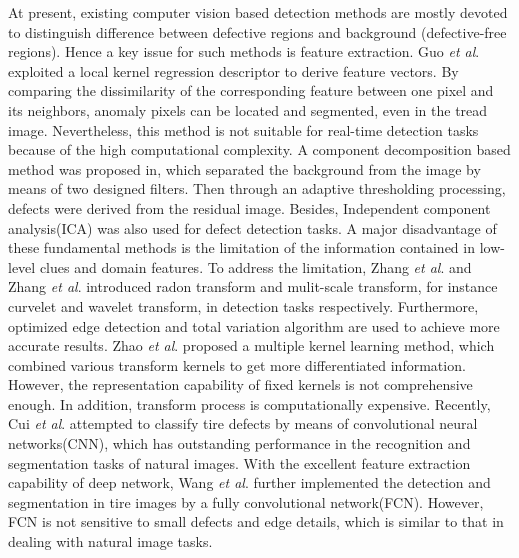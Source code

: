 \documentclass{article}
\begin{document}
At present, existing computer vision based detection methods are mostly devoted to distinguish difference between defective regions and background (defective-free regions). Hence a key issue for such methods is feature extraction. Guo {\it et al}.\cite{guo2016defect} exploited a local kernel regression descriptor to derive feature vectors. By comparing the dissimilarity of the corresponding feature between one pixel and its neighbors, anomaly pixels can be located and segmented, even in the tread image. Nevertheless, this method is not suitable for real-time detection tasks because of the high computational complexity. A component decomposition based method was proposed in\cite{guo2012tire}, which separated the background from the image by means of two designed filters. Then through an adaptive thresholding processing, defects were derived from the residual image. Besides, Independent component analysis(ICA) was also used for defect detection tasks\cite{cui2016defect,cui2016novel}. A major disadvantage of these fundamental methods is the limitation of the information contained in low-level clues and domain features. To address the limitation, Zhang {\it et al}.\cite{zhang2013texture} and Zhang {\it et al}.\cite{zhang2013defect} introduced radon transform and mulit-scale transform, for instance curvelet and wavelet transform, in detection tasks respectively. Furthermore, optimized edge detection and total variation algorithm are used to achieve more accurate results\cite{yan2013detection}. Zhao {\it et al}.\cite{zhao2017tire} proposed a multiple kernel learning method, which combined various transform kernels to get more differentiated information. However, the representation capability of fixed kernels is not comprehensive enough. In addition, transform process is computationally expensive. Recently, Cui {\it et al}.\cite{cui2018tire} attempted to classify tire defects by means of convolutional neural networks(CNN), which has outstanding performance in the recognition and segmentation tasks of natural images. With the excellent feature extraction capability of deep network, Wang {\it et al}.\cite{wang2019tire} further implemented the detection and segmentation in tire images by a fully convolutional network(FCN)\cite{long2015fully}. However, FCN is not sensitive to small defects and edge details, which is similar to that in dealing with natural image tasks.
\end{document}
